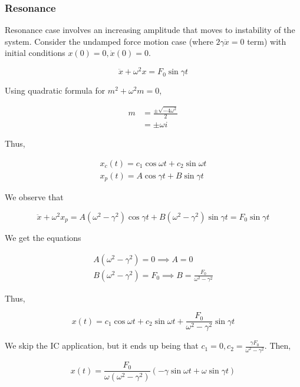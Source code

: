 \subsubsection{Resonance}

Resonance case involves an increasing amplitude that moves to instability of the system.
Consider the undamped force motion case (where $2\gamma\ddot x =0$ term) with initial conditions $x(0)=0,\dot x(0) = 0$.

\begin{equation}
    \ddot x + \omega^2 x=F_0\sin\gamma t
\end{equation}

Using quadratic formula for $m^2+\omega^2 m=0$,

\begin{align}
    m&=\frac{\pm \sqrt{-4\omega^2}}{2}\\
    &=\pm \omega i
\end{align}

Thus,

\begin{eqnarray}
    x_c(t)=c_1\cos\omega t+c_2\sin\omega t\\
    x_p(t)=A\cos\gamma t+B\sin \gamma t
\end{eqnarray}

We observe that

\begin{equation}
    \ddot x+\omega^2x_p=A(\omega^2-\gamma^2)\cos\gamma t+B(\omega^2-\gamma^2)\sin\gamma t=F_0\sin\gamma t
\end{equation}

We get the equations

\begin{eqnarray}
    A(\omega^2-\gamma^2)=0\implies A=0\\
    B(\omega^2-\gamma^2)=F_0\implies B=\frac{F_0}{\omega^2-\gamma^2}
\end{eqnarray}

Thus,

\begin{equation}
    x(t)=c_1\cos\omega t+c_2\sin\omega t+\frac{F_0}{\omega^2-\gamma^2}\sin\gamma t
\end{equation}

We skip the IC application, but it ends up being that $c_1=0,c_2=\frac{\gamma F_0}{\omega^2-\gamma^2}$.
Then,

\begin{equation}
    x(t)=\frac{F_0}{\omega(\omega^2-\gamma^2)}\left(-\gamma \sin\omega t+\omega \sin\gamma t\right)
\end{equation}

